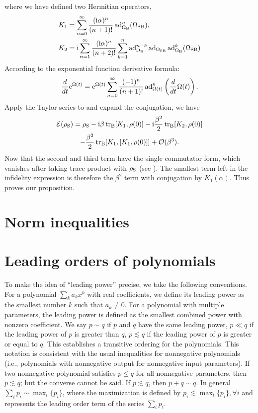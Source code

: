\documentclass[aps,pra,reprint,superscriptaddress]{revtex4-2}
\begin{document}
where we have defined two Hermitian operators,
\begin{align}
& K_1 = \sum_{n=0}^{\infty} \frac{(\mathrm{i} \alpha)^n}{(n+1)!}\operatorname{ad}^n_{\Omega_{\mathrm{B}}}(\Omega_{\mathrm{SB}}), \\
& K_2 = \mathrm{i} \sum_{n=1}^\infty \frac{(\mathrm{i} \alpha)^n}{(n+2)!}\sum_{k=1}^n \operatorname{ad}^{n-k}_{\Omega_{\mathrm{B}}} \operatorname{ad}_{\Omega_{\mathrm{SB}}} \operatorname{ad}^k_{\Omega_{\mathrm{B}}} (\Omega_{\mathrm{SB}})
\end{align}
According to the exponential function derivative  formula:
\begin{equation}
\frac{d}{dt}\mathrm{e}^{\Omega(t)}=\mathrm{e}^{\Omega(t)} \sum_{n=0}^\infty \frac{(-1)^n}{(n+1)!}\operatorname{ad}_{\Omega(t)}^n\left(\frac{d}{dt}\Omega(t)\right).
\end{equation} 
Apply the Taylor series to  and expand the conjugation, we have
\begin{multline}
\mathcal{E}(\rho_\mathrm{S}) = \rho_{\mathrm{S}} - \mathrm{i} \beta \operatorname{\operatorname{tr}_\mathrm{B}}[K_1,\rho(0)] - \mathrm{i} \frac{\beta^2}{2}\operatorname{\operatorname{tr}_\mathrm{B}}[K_2,\rho(0)] \\
- \frac{\beta^2}{2}\operatorname{\operatorname{tr}_\mathrm{B}}[K_1,[K_1,\rho(0)]] + \mathcal{O}(\beta^3).
\end{multline}
Now that the second and third term have the single commutator form, which vanishes after taking trace product with $\rho_{\mathrm{S}}$ (see ). The smallest term left in the infidelity expression is therefore the $\beta^2$ term with conjugation by $K_1(\alpha)$. Thus 
proves our proposition. 

\section{Norm inequalities}\label{app:norm-ineq}

\section{Leading orders of polynomials}\label{app:polynomials}

To make the idea of ``leading power'' precise, we take the following conventions. 
For a polynomial $\sum_{k} a_k x^k$ with real coefficients, we define its leading power as the smallest number $k$ such that $a_k\neq 0$. For a polynomial with multiple parameters, the leading power is defined as the smallest combined power with nonzero coefficient.
We say $p\mathbin{\sim}q$ if $p$ and $q$ have the same leading power, $p\ll q$ if the leading power of $p$ is greater than $q$, $p\lesssim q$ if the leading power of $p$ is greater or equal to $q$. This establishes a transitive ordering for the polynomials. This notation is consistent with the usual inequalities for nonnegative polynomials (i.e., polynomials with nonnegative output for nonnegative input parameters). If two nonnegative polynomial satisfies $p\le q$ for all nonnegative parameters, then $p\lesssim q$; but the converse cannot be said.
If $p\lesssim q$, then $p+q \sim q$. In general $\sum_i p_i \sim \max_i \{ p_i \}$, where the maximization is defined by $p_i \lesssim \max_i \{ p_i \}, \forall i$ and represents the leading order term of the series $\sum_i p_i$. 
\end{document}
